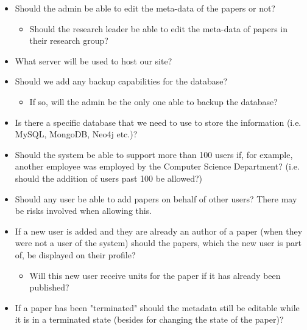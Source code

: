 \documentclass[a4paper,12pt]{article}
\begin{document}
\begin{itemize}	
\item Should the admin be able to edit the meta-data of the papers or not?
	\begin{itemize}
	\item Should the research leader be able to edit the meta-data of papers in their research group?
	\end{itemize}
\item What server will be used to host our site? 
\item Should we add any backup capabilities for the database?
	\begin{itemize}
	\item If so, will the admin be the only one able to backup the database?
	\end{itemize}
\item Is there a specific database that we need to use to store the information (i.e. MySQL, MongoDB, Neo4j etc.)?
\item Should the system be able to support more than 100 users if, for example, another employee was employed by the Computer Science Department? (i.e. should the addition of users past 100 be allowed?)
\item Should any user be able to add papers on behalf of other users? There may be risks involved when allowing this.
\item If a new user is added and they are already an author of a paper (when they were not a user of the system) should the papers, which the new user is part of, be displayed on their profile?
	\begin{itemize}
	\item Will this new user receive units for the paper if it has already been published?
	\end{itemize}
\item If a paper has been "terminated" should the metadata still be editable while it is in a terminated state (besides for changing the state of the paper)?
\end{itemize}
\end{document}
